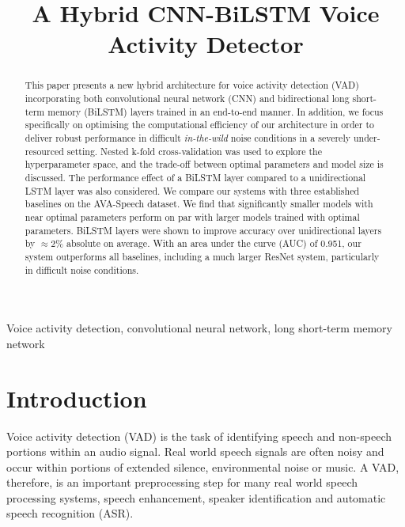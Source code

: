 \documentclass{article}
\title{A Hybrid CNN-BiLSTM Voice Activity Detector}
\begin{document}
\maketitle
\thispagestyle{firstpage}
\newpage

\begin{abstract}
This paper presents a new hybrid architecture for voice activity detection (VAD) incorporating both convolutional neural network (CNN) and bidirectional long short-term memory (BiLSTM) layers trained in an end-to-end manner.
In addition, we focus specifically on optimising the computational efficiency of our architecture in order to deliver robust performance in difficult \textit{in-the-wild} noise conditions in a severely under-resourced setting.
Nested k-fold cross-validation was used to explore the hyperparameter space, and the trade-off between optimal parameters and model size is discussed.
The performance effect of a BiLSTM layer compared to a unidirectional LSTM layer was also considered.
We compare our systems with three established baselines on the AVA-Speech dataset.
We find that significantly smaller models with near optimal parameters perform on par with larger models trained with optimal parameters.
BiLSTM layers were shown to improve accuracy over unidirectional layers by $\approx$2\% absolute on average.
With an area under the curve (AUC) of 0.951, our system outperforms all baselines, including a much larger ResNet system, particularly in difficult noise conditions.
\end{abstract}

\begin{keywords}
Voice activity detection, convolutional neural network, long short-term memory network
\end{keywords}



\section{Introduction}
\label{sec:intro}

\vspace{-2mm}

Voice activity detection (VAD) is the task of identifying speech and non-speech portions within an audio signal.
Real world speech signals are often noisy and occur within portions of extended silence, environmental noise or music.
A VAD, therefore, is an important preprocessing step for many real world speech processing systems, speech enhancement, speaker identification and automatic speech recognition (ASR).
\end{document}
